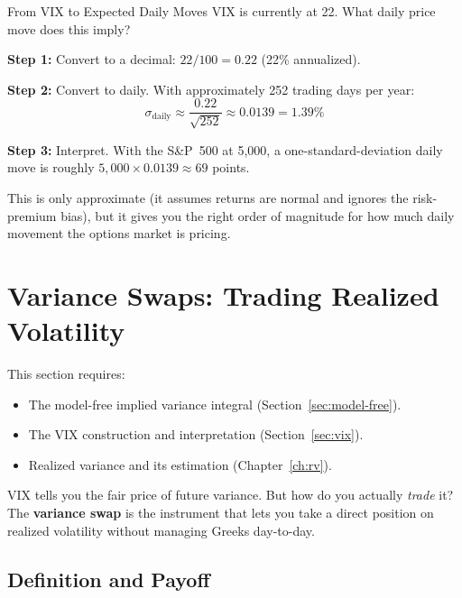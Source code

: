 \begin{workedexample}{From VIX to Expected Daily Moves}
VIX is currently at 22.
What daily price move does this imply?

\textbf{Step 1:} Convert to a decimal: $22/100 = 0.22$ (22\% annualized).

\textbf{Step 2:} Convert to daily.
With approximately 252 trading days per year:
\[
  \sigma_{\text{daily}} \approx \frac{0.22}{\sqrt{252}} \approx 0.0139 = 1.39\%
\]

\textbf{Step 3:} Interpret.
With the S\&P~500 at 5{,}000, a one-standard-deviation daily move is roughly $5{,}000 \times 0.0139 \approx 69$ points.

This is only approximate (it assumes returns are normal and ignores the risk-premium bias), but it gives you the right order of magnitude for how much daily movement the options market is pricing.
\end{workedexample}


\section{Variance Swaps: Trading Realized Volatility}\label{sec:var-swap}

\begin{prereq}
This section requires:
\begin{itemize}[nosep]
  \item The model-free implied variance integral (Section~\ref{sec:model-free}).
  \item The VIX construction and interpretation (Section~\ref{sec:vix}).
  \item Realized variance and its estimation (Chapter~\ref{ch:rv}).
\end{itemize}
\end{prereq}

VIX tells you the fair price of future variance.
But how do you actually \emph{trade} it?
The \textbf{variance swap} is the instrument that lets you take a direct position on realized volatility without managing Greeks day-to-day.

\subsection{Definition and Payoff}

